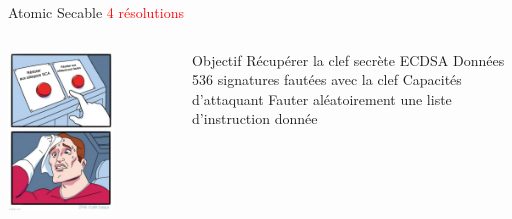 \begin{frame}{Atomic Secable \FiveStar\FiveStar\FiveStar \hfill \textcolor{red}{4 résolutions}}
\begin{columns}[c]
        \begin{center}                  
            \includegraphics[width=0.65\textwidth]{img/meme/atomic-secable-intro.png}
        \end{center}

           \begin{outline}
                \1 Objectif
                    \2 Récupérer la clef secrète ECDSA
                \pause
                \1 Données
                     536 signatures fautées avec la clef
                \pause
                \1 Capacités d'attaquant
                    \2 Fauter aléatoirement une liste d'instruction donnée
           \end{outline}
    \end{columns}
\end{frame}

